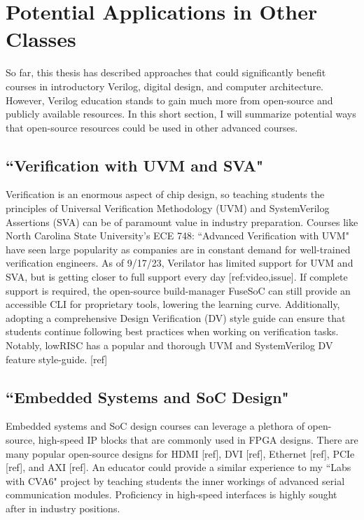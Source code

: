 
\chapter{Potential Applications in Other Classes}
\label{chapter:other_classes}

So far, this thesis has described approaches that could significantly benefit courses in introductory Verilog, digital design, and computer architecture. However, Verilog education stands to gain much more from open-source and publicly available resources. In this short section, I will summarize potential ways that open-source resources could be used in other advanced courses.

\section{``Verification with UVM and SVA"}

Verification is an enormous aspect of chip design, so teaching students the principles of Universal Verification Methodology (UVM) and SystemVerilog Assertions (SVA) can be of paramount value in industry preparation. Courses like North Carolina State University's ECE 748: ``Advanced Verification with UVM" have seen large popularity as companies are in constant demand for well-trained verification engineers. As of 9/17/23, Verilator has limited support for UVM and SVA, but is getting closer to full support every day [ref:video,issue]. If complete support is required, the open-source build-manager FuseSoC can still provide an accessible CLI for proprietary tools, lowering the learning curve. Additionally, adopting a comprehensive Design Verification (DV) style guide can ensure that students continue following best practices when working on verification tasks. Notably, lowRISC has a popular and thorough UVM and SystemVerilog DV feature style-guide. [ref]

\section{``Embedded Systems and SoC Design"}

Embedded systems and SoC design courses can leverage a plethora of open-source, high-speed IP blocks that are commonly used in FPGA designs. There are many popular open-source designs for HDMI [ref], DVI [ref], Ethernet [ref], PCIe [ref], and AXI [ref]. An educator could provide a similar experience to my ``Labs with CVA6" project by teaching students the inner workings of advanced serial communication modules. Proficiency in high-speed interfaces is highly sought after in industry positions.

